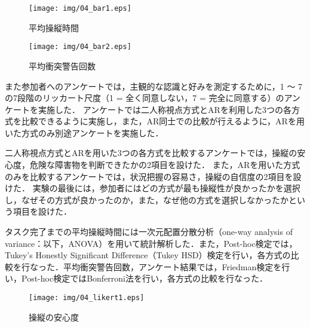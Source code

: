 \documentclass[submit, sigrecommended]{ipsj}
\begin{document}
  \begin{figure}[tb]
    \centering
    \texttt{[image: img/04\_bar1.eps]}
    \caption{平均操縦時間}
    \label{fig:04_bar1}
    \end{figure}
    
    \begin{figure}[tb]
    \centering
    \texttt{[image: img/04\_bar2.eps]}
    \caption{平均衝突警告回数}
    \label{fig:04_bar2}
    \end{figure}
    

\par
また参加者へのアンケートでは，主観的な認識と好みを測定するために，1 〜 7 の7段階のリッカート尺度（1 = 全く同意しない，7 = 完全に同意する）のアンケートを実施した．
アンケートでは二人称視点方式とARを利用した3つの各方式を比較できるように実施し，また，AR同士での比較が行えるように，ARを用いた方式のみ別途アンケートを実施した．
\par
二人称視点方式とARを用いた3つの各方式を比較するアンケートでは，操縦の安心度，危険な障害物を判断できたかの2項目を設けた．
また，ARを用いた方式のみを比較するアンケートでは，状況把握の容易さ，操縦の自信度の2項目を設けた．
実験の最後には，参加者にはどの方式が最も操縦性が良かったかを選択し，なぜその方式が良かったのか，また，なぜ他の方式を選択しなかったかという項目を設けた．
\par
タスク完了までの平均操縦時間には一次元配置分散分析（one-way analysis of variance：以下，ANOVA）を用いて統計解析した．また，Post-hoc検定では，Tukey’s Honestly Significant Difference（Tukey HSD）検定を行い，各方式の比較を行なった．平均衝突警告回数，アンケート結果では，Friedman検定を行い，Post-hoc検定ではBonferroni法を行い，各方式の比較を行なった．


\begin{figure}[tb]
  \centering
  \texttt{[image: img/04\_likert1.eps]}
  \caption{操縦の安心度}
  \label{fig:04_likert1}
  \end{figure}
  
\end{document}
